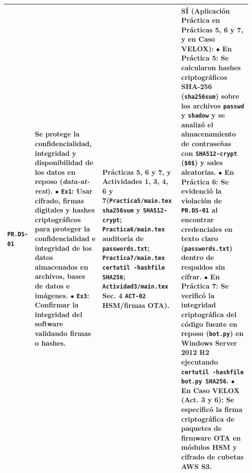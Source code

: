 \documentclass[letterpaper,11pt]{article}
\begin{document}
\begin{longtable}{|C{1.5cm}|L{5.3cm}|L{4.3cm}|L{5.8cm}|}
\texttt{PR.DS-01} &
\textbf{Se protege la confidencialidad, integridad y disponibilidad de los datos en reposo (\textit{data-at-rest}).}\newline
$\bullet$ \texttt{Ex1}: \textbf{Usar cifrado, firmas digitales y hashes criptográficos para proteger la confidencialidad e integridad de los datos almacenados en archivos, bases de datos e imágenes}.\newline
$\bullet$ \texttt{Ex3}: Confirmar la integridad del software validando firmas o hashes. &
\textbf{Prácticas 5, 6 y 7, y Actividades 1, 3, 4, 6 y 7}\newline (\texttt{Practica5/main.tex} \texttt{sha256sum} y \texttt{SHA512-crypt}; \texttt{Practica6/main.tex} auditoría de \texttt{passwords.txt}; \texttt{Practica7/main.tex} \texttt{certutil -hashfile SHA256}; \texttt{Actividad3/main.tex} Sec. 4 \texttt{ACT-02} HSM/firmas OTA). &
\textbf{SÍ (Aplicación Práctica en Prácticas 5, 6 y 7, y en Caso VELOX):}\newline
$\bullet$ \textbf{En Práctica 5:} Se calcularon hashes criptográficos \textbf{SHA-256} (\texttt{sha256sum}) sobre los archivos \texttt{passwd} y \texttt{shadow} y se analizó el almacenamiento de contraseñas con \texttt{SHA512-crypt} (\texttt{\$6\$}) y sales aleatorias.\newline
$\bullet$ \textbf{En Práctica 6:} Se evidenció la violación de \texttt{PR.DS-01} al encontrar credenciales en texto claro (\texttt{passwords.txt}) dentro de respaldos sin cifrar.\newline
$\bullet$ \textbf{En Práctica 7:} Se verificó la integridad criptográfica del código fuente en reposo (\texttt{bot.py}) en Windows Server 2012 R2 ejecutando \texttt{certutil -hashfile bot.py SHA256}.\newline
$\bullet$ \textbf{En Caso VELOX (Act. 3 y 6):} Se especificó la firma criptográfica de paquetes de firmware OTA en módulos \textbf{HSM} y cifrado de cubetas AWS S3. \\
\hline


\end{longtable}
\end{document}

